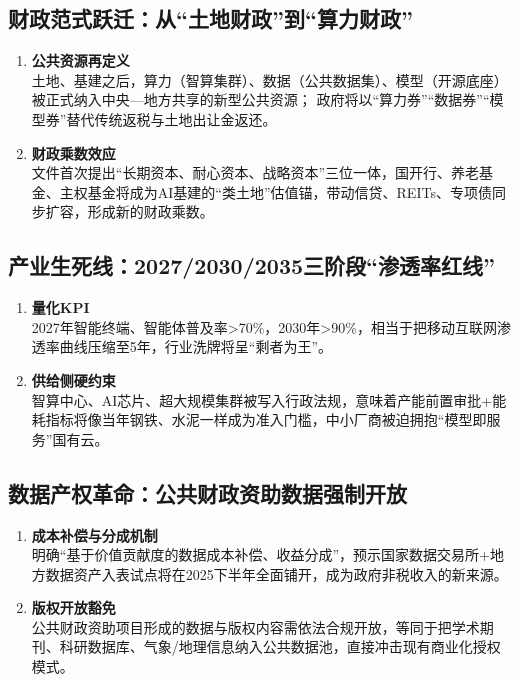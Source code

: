 \subsection{财政范式跃迁：从“土地财政”到“算力财政”}
\begin{enumerate}[leftmargin=*, nosep]
    \item \textbf{公共资源再定义}  \\
    {\color{red}土地、基建之后，算力（智算集群）、数据（公共数据集）、模型（开源底座）被正式纳入中央—地方共享的新型公共资源；
    政府将以“算力券”“数据券”“模型券”替代传统返税与土地出让金返还。}
    \item \textbf{财政乘数效应}  \\
    文件首次提出“长期资本、耐心资本、战略资本”三位一体，国开行、养老基金、主权基金将成为AI基建的“类土地”估值锚，带动信贷、REITs、专项债同步扩容，形成新的财政乘数。
\end{enumerate}

\subsection{产业生死线：2027/2030/2035三阶段“渗透率红线”}
\begin{enumerate}[leftmargin=*, nosep]
    \item \textbf{量化KPI}  \\
    2027年智能终端、智能体普及率>70\%，2030年>90\%，相当于把移动互联网渗透率曲线压缩至5年，行业洗牌将呈“剩者为王”。
    \item \textbf{供给侧硬约束}  \\
    智算中心、AI芯片、超大规模集群被写入行政法规，意味着{\color{red}产能前置审批+能耗指标}将像当年钢铁、水泥一样成为准入门槛，中小厂商被迫拥抱“模型即服务”国有云。
\end{enumerate}

\subsection{数据产权革命：公共财政资助数据强制开放}
\begin{enumerate}[leftmargin=*, nosep]
    \item \textbf{成本补偿与分成机制}  \\
    明确“基于价值贡献度的数据成本补偿、收益分成”，预示{\color{red}国家数据交易所+地方数据资产入表试点}将在2025下半年全面铺开，成为{\color{red}政府非税收入的新来源}。
    \item \textbf{版权开放豁免}  \\
    公共财政资助项目形成的数据与版权内容需依法合规开放，等同于把学术期刊、科研数据库、气象/地理信息纳入公共数据池，直接冲击现有商业化授权模式。
\end{enumerate}

